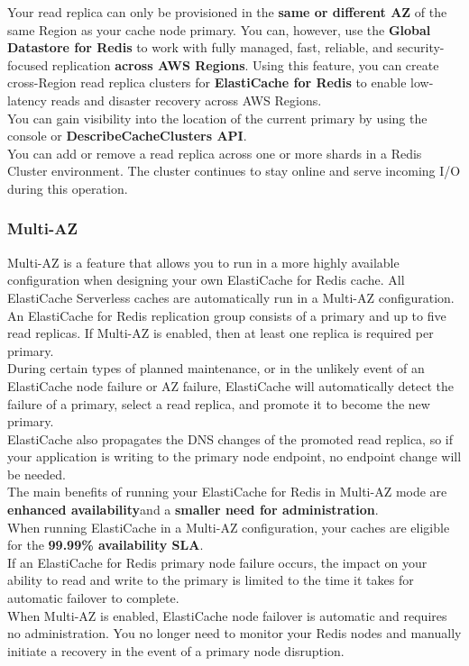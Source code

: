 \documentclass[12pt, letterpaper, twoside]{article}
\begin{document}
Your read replica can only be provisioned in the \textbf{same or different AZ} of the same Region as your cache node primary. 
You can, however, use the \textbf{Global Datastore for Redis} to work with fully managed, fast, reliable, and security-focused 
replication \textbf{across AWS Regions}. Using this feature, you can create cross-Region read replica clusters for \textbf{
ElastiCache for Redis} to enable low-latency reads and disaster recovery across AWS Regions.\\

You can gain visibility into the location of the current primary by using the console or \textbf{DescribeCacheClusters API}.\\

You can add or remove a read replica across one or more shards in a Redis Cluster environment. The cluster continues to stay 
online and serve incoming I/O during this operation.\\

\subsubsection{Multi-AZ}
Multi-AZ is a feature that allows you to run in a more highly available configuration when designing your own ElastiCache for 
Redis cache. All ElastiCache Serverless caches are automatically run in a Multi-AZ configuration. An ElastiCache for Redis 
replication group consists of a primary and up to five read replicas. If Multi-AZ is enabled, then at least one replica is required 
per primary.\\
During certain types of planned maintenance, or in the unlikely event of an ElastiCache node failure or AZ failure, ElastiCache 
will automatically detect the failure of a primary, select a read replica, and promote it to become the new primary.\\
ElastiCache also propagates the DNS changes of the promoted read replica, so if your application is writing to the primary node 
endpoint, no endpoint change will be needed.\\

The main benefits of running your ElastiCache for Redis in Multi-AZ mode are \textbf{enhanced availability}and a \textbf{smaller 
need for administration}.\\
When running ElastiCache in a Multi-AZ configuration, your caches are eligible for the \textbf{99.99\% availability SLA}.\\
If an ElastiCache for Redis primary node failure occurs, the impact on your ability to read and write to the primary is limited 
to the time it takes for automatic failover to complete.\\
When Multi-AZ is enabled, ElastiCache node failover is automatic and requires no administration. You no longer need to monitor 
your Redis nodes and manually initiate a recovery in the event of a primary node disruption.\\
\end{document}
